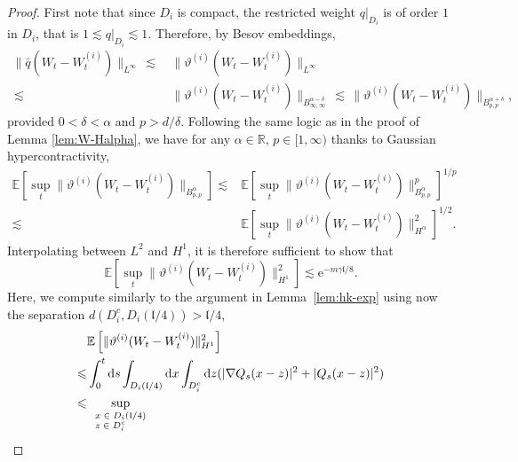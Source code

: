 \documentclass[11pt, a4paper]{scrartcl}
\numberwithin{equation}{section}
\theoremstyle{plain}
\theoremstyle{remark}
\newcommand{\mathd}{\mathrm{d}}
\newcommand{\mathe}{\mathrm{e}}
\newcommand{\tmscript}[1]{\text{\scriptsize{$#1$}}}
\begin{document}
\begin{proof}
  First note that since $D_i$ is compact, the restricted weight $q|_{D_i}$ is
  of order $1$ in $D_i$, that is $1 \lesssim q|_{D_i} \lesssim 1$. Therefore,
  by Besov embeddings,
  \begin{equation*}  
    \begin{aligned}
      \| \bar{q} (W_t - W_t^{(i)}) \|_{L^{\infty}} 
    \,\lesssim\, & \| \vartheta^{(i)} (W_t -
     W_t^{(i)}) \|_{L^{\infty}} \\
    \,\lesssim\, & \| \vartheta^{(i)} (W_t - W_t^{(i)})
     \|_{B^{\alpha - \delta}_{\infty, \infty}}
    \,\lesssim\,  \| \vartheta^{(i)} (W_t -
     W_t^{(i)}) \|_{B_{p, p}^{\alpha + \delta}}, 
    \end{aligned}
  \end{equation*}  
  provided $0 < \delta < \alpha$ and $p > d / \delta$. Following the same
  logic as in the proof of Lemma \ref{lem:W-Halpha}, we have for any $\alpha
  \in \mathbb{R}$, $p \in [1, \infty)$ thanks to Gaussian hypercontractivity,
  \begin{equation*}
    \begin{aligned}
      \mathbb{E} [\sup_t \| \vartheta^{(i)} (W_t - W_t^{(i)}) \|_{B_{p, p}^{\alpha}}]
     \lesssim & \mathbb{E} [\sup_t \| \vartheta^{(i)} (W_t - W_t^{(i)}) \|_{B_{p,
     p}^{\alpha}}^p]^{1 / p} \\
     \lesssim & \mathbb{E} [\sup_t \| \vartheta^{(i)} (W_t -
     W_t^{(i)}) \|_{H^{\alpha}}^2]^{1 / 2} .
    \end{aligned} 
  \end{equation*}
  Interpolating between $L^2$ and $H^1$, it is therefore sufficient to show
  that
  \[ \mathbb{E} \left[\sup_t \| \vartheta^{(i)} (W_t - W_t^{(i)}) \|^2_{H^1}\right] \lesssim
     \mathe^{- m \gamma \mathfrak{l}/ 8} . \]
  Here, we compute similarly to the argument in Lemma~\ref{lem:hk-exp} using
  now the separation $d (D_i^c, D_i (\mathfrak{l}/ 4)) >\mathfrak{l}/ 4$,
  \begin{align*}
       & \mathbb{E} \left[\| \vartheta^{(i)} (W_t - W_t^{(i)})
       \|_{{H^1}}^2\right]\\
       \leqslant & \int_0^t \mathd s \int_{D_i (\mathfrak{l}/ 4)} \mathd x
       \int_{D_i^c} \mathd z (| \nabla Q_s (x - z) |^2 + | Q_s (x - z) |^2)\\
       \leqslant & \sup_{\tmscript{\begin{array}{l}
         x \in D_i (\mathfrak{l}/ 4)\\
         z \in D_i^c

\end{array}}}
\end{align*}
\end{proof}
\end{document}
